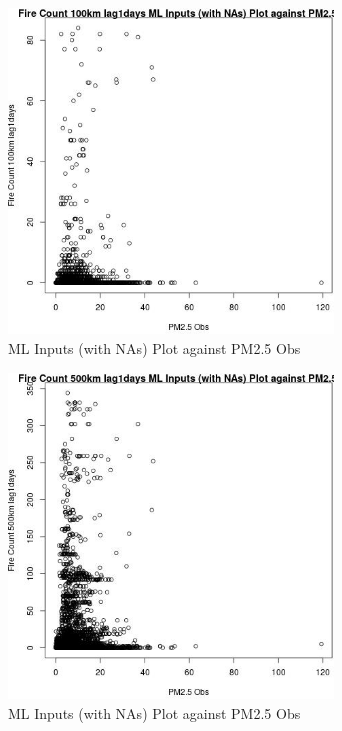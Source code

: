 \begin{figure} 
\centering  
\includegraphics[width=0.77\textwidth]{Code_Outputs/Report_ML_input_PM25_Step4_part_e_de_duplicated_aves_compiled_2019-05-18wNAs_Fire_Count_100km_lag1daysvPM25_Obs.jpg} 
\caption{\label{fig:Report_ML_input_PM25_Step4_part_e_de_duplicated_aves_compiled_2019-05-18wNAsFire_Count_100km_lag1daysvPM25_Obs}ML Inputs (with NAs) Plot against PM2.5 Obs} 
\end{figure} 
 

\begin{figure} 
\centering  
\includegraphics[width=0.77\textwidth]{Code_Outputs/Report_ML_input_PM25_Step4_part_e_de_duplicated_aves_compiled_2019-05-18wNAs_Fire_Count_500km_lag1daysvPM25_Obs.jpg} 
\caption{\label{fig:Report_ML_input_PM25_Step4_part_e_de_duplicated_aves_compiled_2019-05-18wNAsFire_Count_500km_lag1daysvPM25_Obs}ML Inputs (with NAs) Plot against PM2.5 Obs} 
\end{figure} 
 


